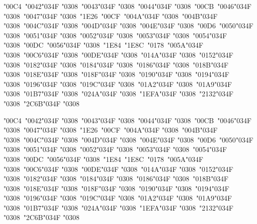 \documentclass[10pt]{article}
\newcommand{\cgj}{\char"034F }
\begin{document}
\par\noindent{}\parbox[t]{\dimexpr\linewidth-2.4cm}{\PropR\fontsize{18}{30}\selectfont\raggedright {\color{pre}\char"00C4}\ \char"0042\cgj\char"0308\ \char"0043\cgj\char"0308\ \char"0044\cgj\char"0308\ {\color{pre}\char"00CB}\ \char"0046\cgj\char"0308\ \char"0047\cgj\char"0308\ {\color{pre}\char"1E26}\ {\color{pre}\char"00CF}\ \char"004A\cgj\char"0308\ \char"004B\cgj\char"0308\ \char"004C\cgj\char"0308\ \char"004D\cgj\char"0308\ \char"004E\cgj\char"0308\ {\color{pre}\char"00D6}\ \char"0050\cgj\char"0308\ \char"0051\cgj\char"0308\ \char"0052\cgj\char"0308\ \char"0053\cgj\char"0308\ \char"0054\cgj\char"0308\ {\color{pre}\char"00DC}\ \char"0056\cgj\char"0308\ {\color{pre}\char"1E84}\ {\color{pre}\char"1E8C}\ {\color{pre}\char"0178}\ \char"005A\cgj\char"0308\ \char"00C6\cgj\char"0308\ \char"00DE\cgj\char"0308\ \char"014A\cgj\char"0308\ \char"0152\cgj\char"0308\ \char"0182\cgj\char"0308\ \char"0184\cgj\char"0308\ \char"0186\cgj\char"0308\ \char"018B\cgj\char"0308\ \char"018E\cgj\char"0308\ \char"018F\cgj\char"0308\ \char"0190\cgj\char"0308\ \char"0194\cgj\char"0308\ \char"0196\cgj\char"0308\ \char"019C\cgj\char"0308\ \char"01A2\cgj\char"0308\ \char"01A9\cgj\char"0308\ \char"01B7\cgj\char"0308\ \char"024A\cgj\char"0308\ \char"1EFA\cgj\char"0308\ \char"2132\cgj\char"0308\ \char"2C6B\cgj\char"0308}\par
\par\noindent{}\parbox[t]{\dimexpr\linewidth-2.4cm}{\PropI\fontsize{18}{30}\selectfont\raggedright {\color{pre}\char"00C4}\ \char"0042\cgj\char"0308\ \char"0043\cgj\char"0308\ \char"0044\cgj\char"0308\ {\color{pre}\char"00CB}\ \char"0046\cgj\char"0308\ \char"0047\cgj\char"0308\ {\color{pre}\char"1E26}\ {\color{pre}\char"00CF}\ \char"004A\cgj\char"0308\ \char"004B\cgj\char"0308\ \char"004C\cgj\char"0308\ \char"004D\cgj\char"0308\ \char"004E\cgj\char"0308\ {\color{pre}\char"00D6}\ \char"0050\cgj\char"0308\ \char"0051\cgj\char"0308\ \char"0052\cgj\char"0308\ \char"0053\cgj\char"0308\ \char"0054\cgj\char"0308\ {\color{pre}\char"00DC}\ \char"0056\cgj\char"0308\ {\color{pre}\char"1E84}\ {\color{pre}\char"1E8C}\ {\color{pre}\char"0178}\ \char"005A\cgj\char"0308\ \char"00C6\cgj\char"0308\ \char"00DE\cgj\char"0308\ \char"014A\cgj\char"0308\ \char"0152\cgj\char"0308\ \char"0182\cgj\char"0308\ \char"0184\cgj\char"0308\ \char"0186\cgj\char"0308\ \char"018B\cgj\char"0308\ \char"018E\cgj\char"0308\ \char"018F\cgj\char"0308\ \char"0190\cgj\char"0308\ \char"0194\cgj\char"0308\ \char"0196\cgj\char"0308\ \char"019C\cgj\char"0308\ \char"01A2\cgj\char"0308\ \char"01A9\cgj\char"0308\ \char"01B7\cgj\char"0308\ \char"024A\cgj\char"0308\ \char"1EFA\cgj\char"0308\ \char"2132\cgj\char"0308\ \char"2C6B\cgj\char"0308}\par
\end{document}
